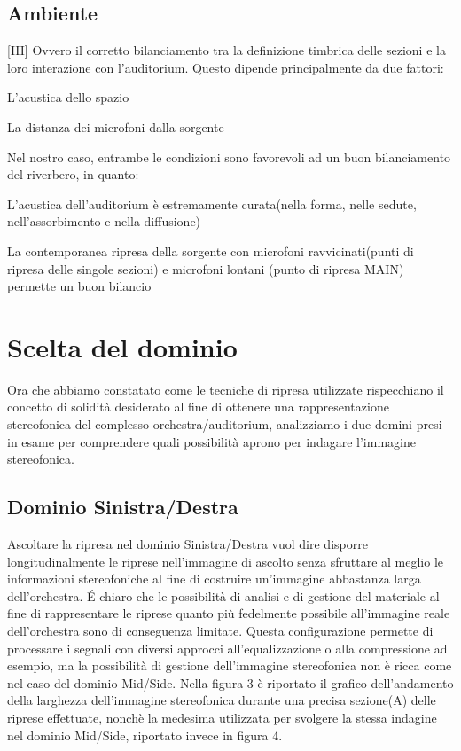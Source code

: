 	\subsection*{Ambiente}[III]
	Ovvero il corretto bilanciamento tra la definizione timbrica delle sezioni e la loro interazione con l'auditorium. Questo dipende principalmente da due fattori:
	\begin{compactitem}
		\item L'acustica dello spazio
		\item La distanza dei microfoni dalla sorgente
	\end{compactitem}
	Nel nostro caso, entrambe le condizioni sono favorevoli ad un buon bilanciamento del riverbero, in quanto:
	\begin{compactitem}
		\item L'acustica dell'auditorium è estremamente curata(nella forma, nelle sedute, nell'assorbimento e nella diffusione)
		\item La contemporanea ripresa della sorgente con microfoni ravvicinati(punti di ripresa delle singole sezioni) e microfoni lontani (punto di ripresa MAIN) permette un buon bilancio
	\end{compactitem}
	
	\section*{Scelta del dominio}
	Ora che abbiamo constatato come le tecniche di ripresa utilizzate rispecchiano il concetto di solidità desiderato al fine di ottenere una rappresentazione stereofonica del complesso orchestra/auditorium, analizziamo i due domini presi in esame per comprendere quali possibilità aprono per indagare l'immagine stereofonica.
	
	\subsection*{Dominio Sinistra/Destra}
	Ascoltare la ripresa nel dominio Sinistra/Destra vuol dire disporre longitudinalmente le riprese nell'immagine di ascolto senza sfruttare al meglio le informazioni stereofoniche al fine di costruire un'immagine abbastanza larga dell'orchestra.
	É chiaro che le possibilità di analisi e di gestione del materiale al fine di rappresentare le riprese quanto più fedelmente possibile all'immagine reale dell'orchestra sono di conseguenza limitate.
	Questa configurazione permette di processare i segnali con diversi approcci all'equalizzazione o alla compressione ad esempio, ma la possibilità di gestione dell'immagine stereofonica non è ricca come nel caso del dominio Mid/Side.
	Nella figura 3 è riportato il grafico dell'andamento della larghezza dell'immagine stereofonica durante una precisa sezione(A) delle riprese effettuate, nonchè la medesima utilizzata per svolgere la stessa indagine nel dominio Mid/Side, riportato invece in figura 4.
	
